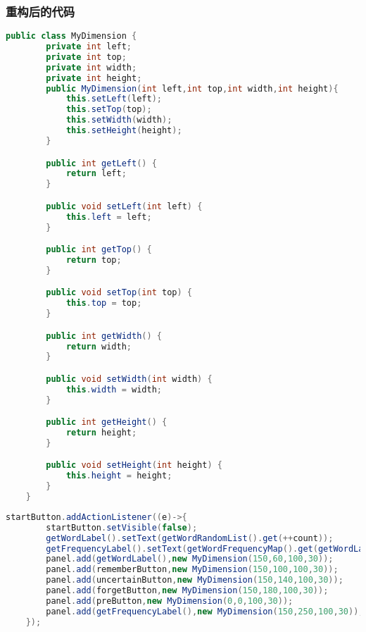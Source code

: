 \documentclass[a4paper]{article}
\begin{document}
\subsubsection*{重构后的代码}
\begin{lstlisting}[language={java}]
    public class MyDimension {
        private int left;
        private int top;
        private int width;
        private int height;
        public MyDimension(int left,int top,int width,int height){
            this.setLeft(left);
            this.setTop(top);
            this.setWidth(width);
            this.setHeight(height);
        }

        public int getLeft() {
            return left;
        }

        public void setLeft(int left) {
            this.left = left;
        }

        public int getTop() {
            return top;
        }

        public void setTop(int top) {
            this.top = top;
        }

        public int getWidth() {
            return width;
        }

        public void setWidth(int width) {
            this.width = width;
        }

        public int getHeight() {
            return height;
        }

        public void setHeight(int height) {
            this.height = height;
        }
    }

\end{lstlisting}
\begin{lstlisting}[language={java}]
    startButton.addActionListener((e)->{
        startButton.setVisible(false);
        getWordLabel().setText(getWordRandomList().get(++count));
        getFrequencyLabel().setText(getWordFrequencyMap().get(getWordLabel().getText()).toString());
        panel.add(getWordLabel(),new MyDimension(150,60,100,30));
        panel.add(rememberButton,new MyDimension(150,100,100,30));
        panel.add(uncertainButton,new MyDimension(150,140,100,30));
        panel.add(forgetButton,new MyDimension(150,180,100,30));
        panel.add(preButton,new MyDimension(0,0,100,30));
        panel.add(getFrequencyLabel(),new MyDimension(150,250,100,30));
    });
\end{lstlisting}
\end{document}
